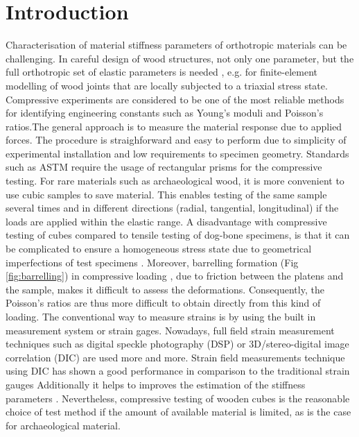 \documentclass[review]{elsarticle}
\begin{document}
\linenumbers

\section{Introduction}

Characterisation of material stiffness parameters of orthotropic materials can
be challenging. In  careful design of wood structures, not only one parameter, but the full
orthotropic set of elastic parameters is needed \cite{tsoumis1991science},
e.g. for finite-element modelling of wood joints that are locally subjected to a triaxial stress state.
Compressive experiments are considered to be one of the most reliable methods
for identifying engineering constants such as Young's moduli and Poisson's
ratios.The general approach is to measure the material response due to applied
forces. The procedure is straighforward and easy to perform due to simplicity of experimental installation and low requirements to specimen
geometry. Standards such as ASTM \cite{standard1997d143,
johnson1983compression}require the usage of rectangular prisms for
the compressive testing.
For rare materials such as archaeological wood, it is more convenient to use
cubic samples \cite{ljungdahl2007transverse} to save material. 
This enables testing of the same sample several times and in
different directions (radial, tangential, longitudinal) if the loads are
applied within the elastic range.
A disadvantage with compressive testing of cubes compared to tensile testing of
dog-bone specimens, is that it can be complicated to ensure a homogeneous stress state
due to geometrical imperfections of test specimens \cite{Toftegaard1999849}.
Moreover, barrelling formation (Fig \ref{fig:barrelling}) in compressive
loading \cite{oldroyd1966stress}, due to friction between the platens and the
sample, makes it difficult to assess the  deformations.
Consequently, the Poisson's ratios are thus more difficult to obtain directly from this kind
of loading.
The conventional way to measure strains is by using the built in measurement
system or strain gages. Nowadays, full field strain measurement techniques such
as digital speckle photography (DSP) \cite{synnergren1999stereoscopic} or
3D/stereo-digital image correlation (DIC) \cite{majano2012test} are used more
and more. Strain field measurements technique using DIC has shown a good
performance in comparison to the traditional strain gauges
\cite{huang2010optical,xavier2012stereovision} Additionally it helps to
improves the estimation of the stiffness parameters \cite{dahl2009planar,
majano2012test, ozyhar2013moisture}. 
Nevertheless, compressive testing of wooden cubes is the reasonable 
choice of test method if the amount of available material is limited, as is the case for archaeological material.
\end{document}

